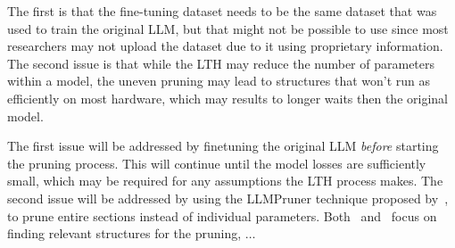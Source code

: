 \documentclass[
	title={Lottery Ticket Hypothesis}
]{cs595project}
\begin{document}
The first is that the fine-tuning dataset needs to be the same dataset that was used to train the original LLM, but that might not be possible to use since most researchers may not upload the dataset due to it using proprietary information.
The second issue is that while the LTH may reduce the number of parameters within a model, the uneven pruning may lead to structures that won't run as efficiently on most hardware, which may results to longer waits then the original model.

The first issue will be addressed by finetuning the original LLM \textit{before} starting the pruning process.
This will continue until the model losses are sufficiently small, which may be required for any assumptions the LTH process makes.
The second issue will be addressed by using the LLMPruner technique proposed by~\citeauthor{LLM-Pruner}, to prune entire sections instead of individual parameters.
Both~\cite{Lottery-Ticket-Hypothesis} and~\cite{LLM-Pruner} focus on finding relevant structures for the pruning, $\dots$

\printbibliography[title={References}, heading=subbibnumbered]
\end{document}
